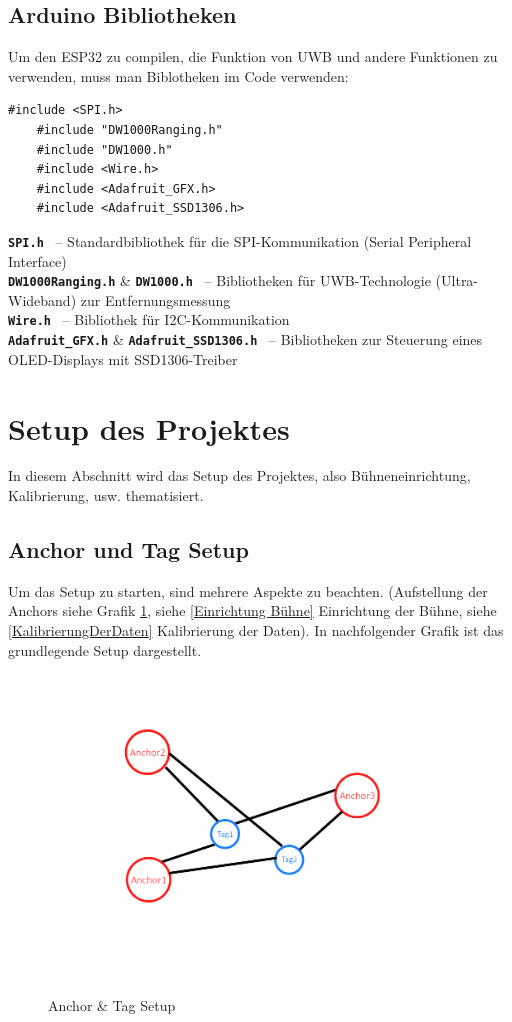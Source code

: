\newpage
\subsection{Arduino Bibliotheken}
Um den ESP32 zu compilen, die Funktion von UWB und andere Funktionen zu verwenden, muss man Biblotheken im Code verwenden: 
\begin{lstlisting}[style=C++, caption=Bibliotheken, captionpos=b]
	#include <SPI.h>
	#include "DW1000Ranging.h"
	#include "DW1000.h"
	#include <Wire.h>
	#include <Adafruit_GFX.h>
	#include <Adafruit_SSD1306.h>
\end{lstlisting}

\textbf{\texttt{SPI.h}} \ – Standardbibliothek für die SPI-Kommunikation (Serial Peripheral Interface) \\
\textbf{\texttt{DW1000Ranging.h}} \& \textbf{\texttt{DW1000.h}} \ – Bibliotheken für UWB-Technologie (Ultra-Wideband) zur Entfernungsmessung \\
\textbf{\texttt{Wire.h}} \ – Bibliothek für I2C-Kommunikation \\
\textbf{\texttt{Adafruit\_GFX.h}} \& \textbf{\texttt{Adafruit\_SSD1306.h}} \ – Bibliotheken zur Steuerung eines OLED-Displays mit SSD1306-Treiber


\newpage
\section{Setup des Projektes}
In diesem Abschnitt wird das Setup des Projektes, also Bühneneinrichtung, Kalibrierung, usw. thematisiert.

\subsection{Anchor und Tag Setup}
Um das Setup zu starten, sind mehrere Aspekte zu beachten. (Aufstellung der Anchors siehe Grafik \ref{fig:AnchorTagSetup}, siehe \ref{Einrichtung Bühne} Einrichtung der Bühne, siehe \ref{KalibrierungDerDaten} Kalibrierung der Daten). In nachfolgender Grafik ist das grundlegende Setup dargestellt.

\begin{figure}[H]
	\centering
	\includegraphics[width=0.9\linewidth]{images/AnchorTagSetup.png}
	\caption[AnchorTagSetup]{Anchor \& Tag Setup}
	\label{fig:AnchorTagSetup}
\end{figure}

